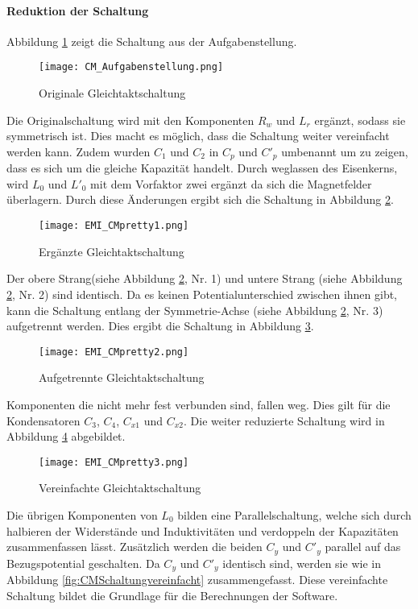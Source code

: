 \paragraph{Reduktion der Schaltung}\label{para:redukGleichtakt}
Abbildung \ref{fig:CMSchaltungOriginal} zeigt die Schaltung aus der Aufgabenstellung. 
\begin{figure}[H]
	\centering
	\texttt{[image: CM\_Aufgabenstellung.png]}
	\caption{Originale Gleichtaktschaltung\cite{aufgabenstellung}}
	\label{fig:CMSchaltungOriginal}
\end{figure}
Die Originalschaltung wird mit den Komponenten $R_w$ und $L_r$ ergänzt, sodass sie symmetrisch ist. Dies macht es möglich, dass die Schaltung weiter vereinfacht werden kann. Zudem wurden $C_1$ und $C_2$ in $C_p$ und $C'_p$ umbenannt um zu zeigen, dass es sich um die gleiche Kapazität handelt. Durch weglassen des Eisenkerns, wird $L_0$ und $L'_0$ mit dem Vorfaktor zwei ergänzt da sich die Magnetfelder überlagern. %
Durch diese Änderungen ergibt sich die Schaltung in Abbildung \ref{fig:CMSchaltungErgänzt}.
\begin{figure}[H]
	\centering
	\texttt{[image: EMI\_CMpretty1.png]}
	\caption{Ergänzte Gleichtaktschaltung}
	\label{fig:CMSchaltungErgänzt}
\end{figure}
 Der obere Strang(siehe Abbildung \ref{fig:CMSchaltungErgänzt}, Nr. 1) und untere Strang (siehe Abbildung \ref{fig:CMSchaltungErgänzt}, Nr. 2) sind identisch. Da es keinen Potentialunterschied zwischen ihnen gibt, kann die Schaltung entlang der Symmetrie-Achse (siehe Abbildung \ref{fig:CMSchaltungErgänzt}, Nr. 3) aufgetrennt werden. Dies ergibt die Schaltung in Abbildung \ref{fig:CMSchaltungaufgetrennt}.

\begin{figure}[H]
	\centering
	\texttt{[image: EMI\_CMpretty2.png]}
	\caption{Aufgetrennte Gleichtaktschaltung}
	\label{fig:CMSchaltungaufgetrennt}
\end{figure}
Komponenten die nicht mehr fest verbunden sind, fallen weg. Dies gilt für die Kondensatoren $C_3$, $C_4$, $C_{x1}$ und $C_{x2}$. Die weiter reduzierte Schaltung wird in Abbildung \ref{fig:CMSchaltungvereinfacht1} abgebildet.
\begin{figure}[H]
	\centering
	\texttt{[image: EMI\_CMpretty3.png]}
	\caption{Vereinfachte Gleichtaktschaltung}
	\label{fig:CMSchaltungvereinfacht1}
\end{figure}
Die übrigen Komponenten von $L_0$ bilden eine Parallelschaltung, welche sich durch halbieren der Widerstände und Induktivitäten und verdoppeln der Kapazitäten zusammenfassen lässt. Zusätzlich werden die beiden $C_y$ und $C'_{y}$ parallel auf das Bezugspotential geschalten. Da $C_y$ und $C'_y$ identisch sind, werden sie wie in Abbildung \ref{fig:CMSchaltungvereinfacht} zusammengefasst. Diese vereinfachte Schaltung bildet die Grundlage für die Berechnungen der Software.

